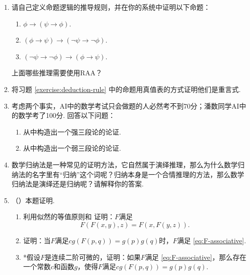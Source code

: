 \begin{enumerate}[wide, labelindent=0pt]
    \item \label{exercise:deduction-rule} 请自己定义命题逻辑的推导规则，并在你的系统中证明以下命题：
    \begin{enumerate}
        \item $\phi\to(\psi\to\phi)$.
        \item $(\phi\to\psi)\to(\neg\psi\to\neg\phi)$.
        \item $(\neg\psi\to\neg\phi)\to(\phi\to\psi)$.
    \end{enumerate}
    上面哪些推理需要使用RAA？

    \item 将习题 \ref{exercise:deduction-rule} 中的命题用真值表的方式证明他们是重言式.
    
    \item 考虑两个事实，AI中的数学考试只会做题的人必然考不到70分；潘数同学AI中的数学考了100分. 回答以下问题：
    \begin{enumerate}
        \item 从中构造出一个强三段论的论证.
        \item 从中构造出一个弱三段论的论证. 
    \end{enumerate}

    \item 数学归纳法是一种常见的证明方法，它自然属于演绎推理，那么为什么数学归纳法的名字里有“归纳”这个词呢？归纳本身是一个合情推理的方法，那么数学归纳法是演绎还是归纳呢？请解释你的答案.
    
    \item \label{exercise:derive-F} （\cite{coxProbabilityFrequencyReasonable1946}）本题证明. 
    \begin{enumerate}
        \item 利用似然的等值原则和 证明：$F$满足
        \begin{equation}
            F(F(x,y),z)=F(x,F(y,z)). \label{eq:F-associative}
        \end{equation}
        \item 证明：当$F$满足$cg(F(p,q))=g(p)g(q)$时，$F$满足 \eqref{eq:F-associative}.
        \item *假设$F$是连续二阶可微的，证明：如果$F$满足 \eqref{eq:F-associative}，那么存在一个常数$c$和函数$g$，使得$F$满足$cg(F(p,q))=g(p)g(q)$.
    \end{enumerate}
    

\end{enumerate}
